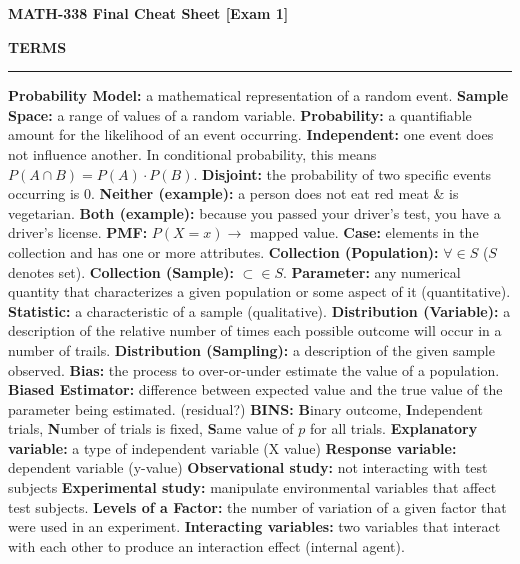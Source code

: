 \documentclass[6pt]{article}
\newcommand{\HL}{\par\noindent\rule{\textwidth}{0.4pt}}
\begin{document}
\begin{footnotesize}

\begin{center}
\textbf{MATH-338 Final Cheat Sheet [Exam 1]}
\end{center}

\begin{flushleft}
\textbf{TERMS}
\end{flushleft}

\HL

\textbf{Probability Model:} a mathematical representation of a random event. 
\textbf{Sample Space:} a range of values of a random variable. 
\textbf{Probability:} a quantifiable amount for the likelihood of an event occurring. 
\textbf{Independent:} one event does not influence another. In conditional probability, this means $P(A \cap B) = P(A) \cdot P(B)$.
\textbf{Disjoint:} the probability of two specific events occurring is 0.
\textbf{Neither (example):} a person does not eat red meat \& is vegetarian.
\textbf{Both (example):} because you passed your driver's test, you have a driver's license.
\textbf{PMF:} $P(X = x) \rightarrow$ mapped value.
\textbf{Case:} elements in the collection and has one or more attributes.
\textbf{Collection (Population):} $\forall \in S$ ($S$ denotes set).
\textbf{Collection (Sample):} $\subset \in S$.
\textbf{Parameter:} any numerical quantity that characterizes a given population or some aspect of it (quantitative).
\textbf{Statistic:} a characteristic of a sample (qualitative).
\textbf{Distribution (Variable):} a description of the relative number of times each possible outcome will occur in a number of trails.
\textbf{Distribution (Sampling):} a description of the given sample observed.
\textbf{Bias:} the process to over-or-under estimate the value of a population.
\textbf{Biased Estimator:} difference between expected value and the true value of the parameter being estimated. (residual?)
\textbf{BINS:} \textbf{B}inary outcome, \textbf{I}ndependent trials, \textbf{N}umber of trials is fixed, \textbf{S}ame value of $p$ for all trials.
\textbf{Explanatory variable:} a type of independent variable (X value)
\textbf{Response variable:} dependent variable (y-value)
\textbf{Observational study:} not interacting with test subjects
\textbf{Experimental study:} manipulate environmental variables that affect test subjects.
\textbf{Levels of a Factor:} the number of variation of a given factor that were used in an experiment.
\textbf{Interacting variables:} two variables that interact with each other to produce an interaction effect (internal agent).

\end{footnotesize}
\end{document}
